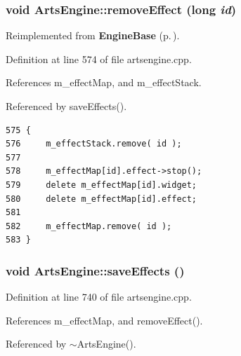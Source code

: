 \subsubsection{\setlength{\rightskip}{0pt plus 5cm}void Arts\-Engine::remove\-Effect (long {\em id})\hspace{0.3cm}{\tt  [virtual]}}\label{classArtsEngine_ArtsEnginea15}




Reimplemented from {\bf Engine\-Base} {\rm (p.\,\pageref{classEngineBase_EngineBasea21})}.

Definition at line 574 of file artsengine.cpp.

References m\_\-effect\-Map, and m\_\-effect\-Stack.

Referenced by save\-Effects().



\footnotesize\begin{verbatim}575 {
576     m_effectStack.remove( id );
577 
578     m_effectMap[id].effect->stop();
579     delete m_effectMap[id].widget;
580     delete m_effectMap[id].effect;
581 
582     m_effectMap.remove( id );
583 }
\end{verbatim}\normalsize 
{}
\subsubsection{\setlength{\rightskip}{0pt plus 5cm}void Arts\-Engine::save\-Effects ()\hspace{0.3cm}{\tt  [private]}}\label{classArtsEngine_ArtsEngined3}




Definition at line 740 of file artsengine.cpp.

References m\_\-effect\-Map, and remove\-Effect().

Referenced by $\sim$Arts\-Engine().



